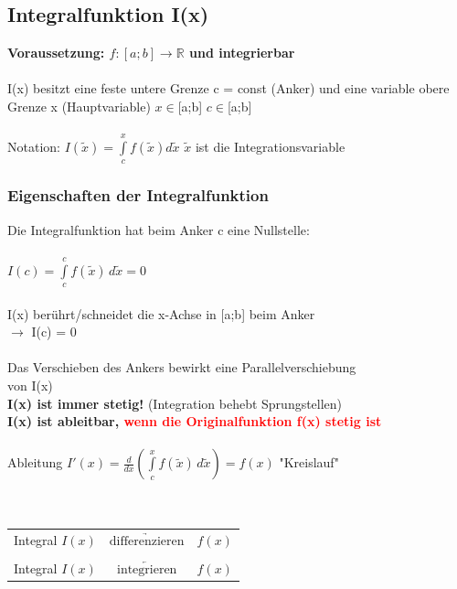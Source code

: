 		
		\subsection{Integralfunktion I(x)}
		\textbf{Voraussetzung: $f: [a;b] \rightarrow \mathbb{R}$ und integrierbar} \\
		 \\
		 I(x) besitzt eine feste untere Grenze c = const (Anker) und eine variable obere Grenze x (Hauptvariable) \quad $x \in $[a;b] \qquad  $c \in $[a;b] \\
		 \\
		 Notation: $I(\tilde{x}) = \int \limits_{c}^{x} f(\tilde{x}) d\tilde{x} $  \qquad $\tilde{x}$ ist die Integrationsvariable 
		 
		 
		 \subsubsection{Eigenschaften der Integralfunktion}
			Die Integralfunktion hat beim Anker c eine Nullstelle: \\
			\\
			$I(c) = \int \limits_{c}^{c} f(\tilde{x}) \, d\tilde{x} = 0 $  \\
		\\	
		I(x) berührt/schneidet die x-Achse in [a;b] beim Anker \\
		$\rightarrow$ I(c) = 0 \\
		\\
		Das Verschieben des Ankers bewirkt eine Parallelverschiebung \\ 
		von I(x) \\
		
		\textbf{I(x) ist immer stetig!} (Integration behebt Sprungstellen) \\
		\textbf{I(x) ist ableitbar, \textcolor{red}{wenn die Originalfunktion f(x) stetig ist}}  \\
		\\
		Ableitung $I'(x) = \frac{d}{dx}\left( \int \limits_{c}^{x} f(\tilde{x}) \, d\tilde{x} \right) = f(x)$ \quad "Kreislauf" \\
		\\
		\\
		\begin{tabular}{l c l}
		Integral $I(x)$ &  $\underrightarrow{\text{differenzieren}}$ & $f(x)$ \\
		\\
		Integral $I(x)$ &  $\underleftarrow{\text{integrieren}}$ &  $f(x)$ 
		\end{tabular}
		
